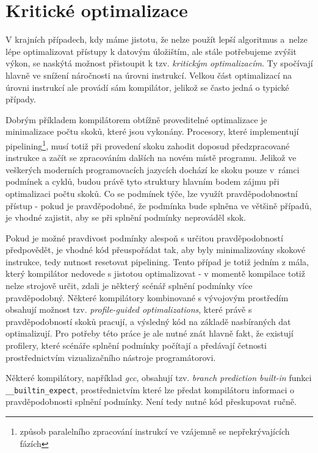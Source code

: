 \documentclass[czech,BP]{thesiskiv}
\begin{document}
\section{Kritické optimalizace}

V krajních případech, kdy máme jistotu, že nelze použít lepší algoritmus a~nelze lépe optimalizovat přístupy k datovým úložištím, ale stále potřebujeme zvýšit výkon, se naskýtá možnost přistoupit k tzv. \emph{kritickým optimalizacím}. Ty spočívají hlavně ve snížení náročnosti na úrovni instrukcí. Velkou část optimalizací na úrovni instrukcí ale provádí sám kompilátor, jelikož se často jedná o typické případy.

Dobrým příkladem kompilátorem obtížně proveditelné optimalizace je minimalizace počtu skoků, které jsou vykonány. Procesory, které implementují pipelining\footnote{způsob paralelního zpracování instrukcí ve vzájemně se nepřekrývajících fázích}, musí totiž při provedení skoku zahodit doposud předzpracované instrukce a začít se zpracováním dalších na novém místě programu. Jelikož ve veškerých moderních programovacích jazycích dochází ke skoku pouze v~rámci podmínek a cyklů, budou právě tyto struktury hlavním bodem zájmu při optimalizaci počtu skoků. Co se podmínek týče, lze využít pravděpodobnostní přístup - pokud je pravděpodobné, že podmínka bude splněna ve většině případů, je vhodné zajistit, aby se při splnění podmínky neprováděl skok.

Pokud je možné pravdivost podmínky alespoň s určitou pravděpodobností předpovědět, je vhodné kód přeuspořádat tak, aby byly minimalizovány skokové instrukce, tedy nutnost resetovat pipelining. Tento případ je totiž jedním z mála, který kompilátor nedovede s jistotou optimalizovat - v momentě kompilace totiž nelze strojově určit, zdali je některý scénář splnění podmínky více pravděpodobný. Některé kompilátory kombinované s vývojovým prostředím obsahují možnost tzv. \emph{profile-guided optimalizations}, které právě s pravděpodobností skoků pracují, a výsledný kód na základě nasbíraných dat optimalizují. Pro potřeby této práce je ale nutné znát hlavně fakt, že existují profilery, které scénáře splnění podmínky počítají a předávají četnosti prostřednictvím vizualizačního nástroje programátorovi.

Některé kompilátory, například \emph{gcc}, obsahují tzv. \emph{branch prediction built-in} funkci \texttt{\_\_builtin\_expect}, prostřednictvím které lze předat kompilátoru informaci o pravděpodobnosti splnění podmínky. Není tedy nutné kód přeskupovat ručně.
\end{document}
